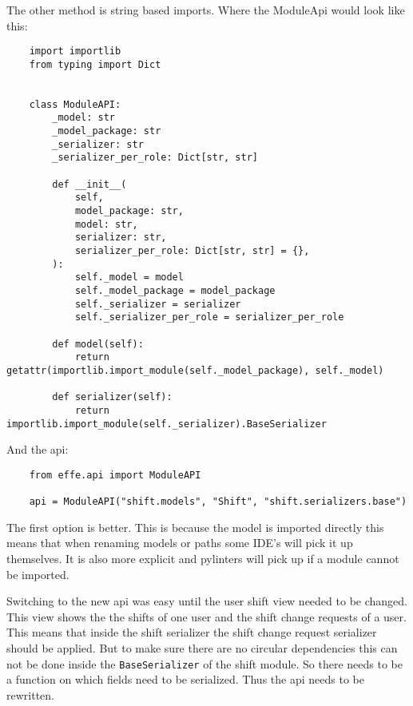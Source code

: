 The other method is string based imports. Where the ModuleApi would look like this:
\begin{verbatim}
    import importlib
    from typing import Dict


    class ModuleAPI:
        _model: str
        _model_package: str
        _serializer: str
        _serializer_per_role: Dict[str, str]

        def __init__(
            self,
            model_package: str,
            model: str,
            serializer: str,
            serializer_per_role: Dict[str, str] = {},
        ):
            self._model = model
            self._model_package = model_package
            self._serializer = serializer
            self._serializer_per_role = serializer_per_role

        def model(self):
            return getattr(importlib.import_module(self._model_package), self._model)

        def serializer(self):
            return importlib.import_module(self._serializer).BaseSerializer
\end{verbatim}

And the api:
\begin{verbatim}
    from effe.api import ModuleAPI

    api = ModuleAPI("shift.models", "Shift", "shift.serializers.base")
\end{verbatim}

The first option is better. This is because the model is imported directly this means that when renaming models or paths some IDE's will pick it up themselves. It is also more explicit and pylinters will pick up if a module cannot be imported.

Switching to the new api was easy until the user shift view needed to be changed. This view shows the the shifts of one user and the shift change requests of a user. This means that inside the shift serializer the shift change request serializer should be applied. But to make sure there are no circular dependencies this can not be done inside the \texttt{BaseSerializer} of the shift module. So there needs to be a function on which fields need to be serialized. Thus the api needs to be rewritten.

